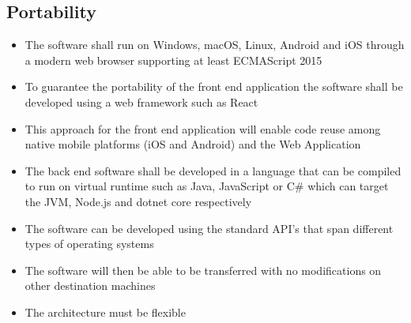\subsection{Portability}
\begin{itemize}
  \item The software shall run on Windows, macOS, Linux, Android and iOS through a modern web browser supporting at least ECMAScript 2015
  \item To guarantee the portability of the front end application the software shall be developed using a web framework such as React
  \item This approach for the front end application will enable code reuse among native mobile platforms (iOS and Android) and the Web Application
  \item The back end software shall be developed in a language that can be compiled to run on virtual runtime such as Java, JavaScript or C\# which can target the JVM, Node.js and dotnet core respectively
  \item The software can be developed using the standard API’s that span different types of operating systems
  \item The software will then be able to be transferred with no modifications on other destination machines
  \item The architecture must be flexible
\end{itemize}
